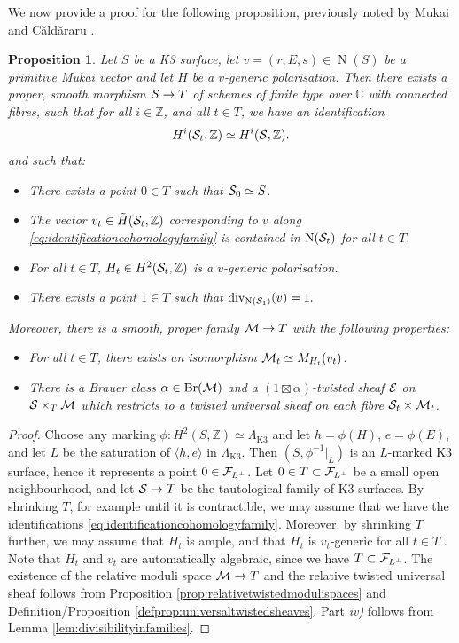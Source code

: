\documentclass[11pt,twoside]{amsart}
\numberwithin{equation}{section}
\newtheorem{proposition}[dummy]{Proposition}
\theoremstyle{definition}
\theoremstyle{plain}
\newcommand{\Z}{\ensuremath{\mathbb{Z}}}
\newcommand{\CC}{\ensuremath{\mathbb{C}}}
\newcommand{\klat}{\ensuremath{\Lambda_{\operatorname{K3}}}}
\def\Br{\operatorname{Br}}
\def\N{\operatorname{N}}
\def\dv{\operatorname{div}}
\begin{document}
We now provide a proof for the following proposition, previously noted by Mukai \cite{Muk87} and C\u ald\u araru \cite{Cal00}.
\begin{proposition}\label{prop:deformuntwistedmoduli}
    Let $S$ be a K3 surface, let $v = (r,E,s)\in \N(S)$ be a primitive Mukai vector and let $H$ be a $v$-generic polarisation. Then there exists a proper, smooth morphism $\mathcal{S}\to T$ of schemes of finite type over $\CC$ with connected fibres, such that for all $i\in \Z$, and all $t\in T$, we have an identification 
    \begin{equation} \label{eq:identificationcohomologyfamily}
    H^i(\calS_t,\Z)\simeq H^i(\calS,\Z).
    \end{equation}
    and such that:
    \begin{itemize}
        \item[i)] There exists a point $0\in T$ such that $\mathcal{S}_0 \simeq S$.
        \item [ii)] The vector $v_t\in \tilde{H}(\calS_t,\Z)$ corresponding to $v$ along \eqref{eq:identificationcohomologyfamily} is contained in $\N(\calS_t)$ for all $t\in T$.
        \item [iii)] For all $t\in T$, $H_t\in H^2(\calS_t,\Z)$ is a $v$-generic polarisation.
        \item [iv)] There exists a point $1\in T$ such that $\dv_{\N(\calS_1)}(v)=1.$ 
    \end{itemize}
    Moreover, there is a smooth, proper family $\mathcal{M}\to T$ with the following properties:
    \begin{itemize}
        \item [v)] For all $t\in T$, there exists an isomorphism $\mathcal{M}_t\simeq M_{H_t}(v_t)$.
        \item [vi)] There is a Brauer class $\alpha\in \Br(\calM)$ and a $(1\boxtimes\alpha)$-twisted sheaf $\mathcal{E}$ on $\mathcal{S}\times_T\mathcal{M}$ which restricts to a twisted universal sheaf on each fibre $\mathcal{S}_t\times\mathcal{M}_t$.
    \end{itemize}
\end{proposition}
\begin{proof}
   Choose any marking $\phi: H^2(S,\Z)\simeq \klat$ and let $h = \phi(H)$, $e = \phi(E)$, and let $L$ be the saturation of $\langle h,e\rangle$ in $\klat$. Then $(S, \phi^{-1}|_{L})$ is an $L$-marked K3 surface, hence it represents a point $0\in \mathcal{F}_{L^\perp}$. Let $0\in T\subset \mathcal{F}_{L^\perp}$ be a small open neighbourhood, and let $\mathcal{S}\to T$ be the tautological family of K3 surfaces. By shrinking $T$, for example until it is contractible, we may assume that we have the identifications \eqref{eq:identificationcohomologyfamily}. Moreover, by shrinking $T$ further, we may assume that $H_t$ is ample, and that $H_t$ is $v_t$-generic for all $t\in T$ \cite{Bri08}. Note that $H_t$ and $v_t$ are automatically algebraic, since we have $T\subset \mathcal{F}_{L^\perp}$. The existence of the relative moduli space $\mathcal{M}\to T$ and the relative twisted universal sheaf follows from Proposition \ref{prop:relativetwistedmodulispaces} and Definition/Proposition \ref{defprop:universaltwistedsheaves}. 
   Part \textit{iv)} follows from Lemma \ref{lem:divisibilityinfamilies}.
\end{proof}
\end{document}
